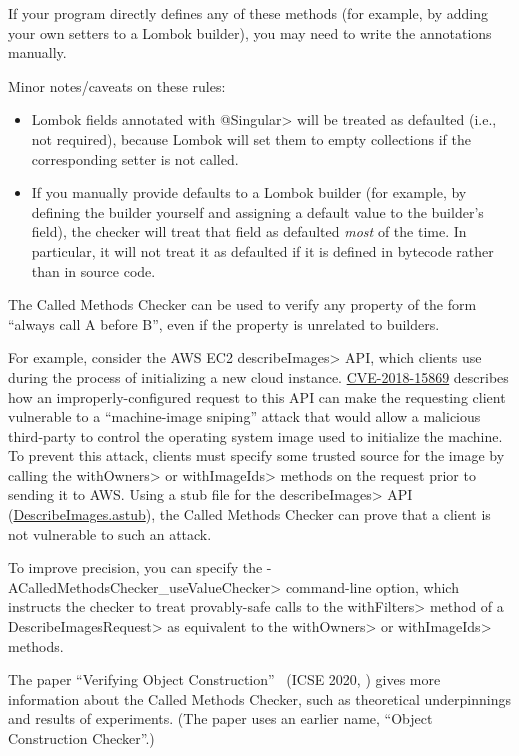 If your program directly defines any of these methods (for example, by adding your own setters to
a Lombok builder), you may need to write the annotations manually.

Minor notes/caveats on these rules:
\begin{itemize}
\item Lombok fields annotated with \<@Singular> will be treated as defaulted (i.e., not required), because
Lombok will set them to empty collections if the corresponding setter is not called.
\item If you manually provide defaults to a Lombok builder (for example, by defining the builder yourself
and assigning a default value to the builder's field), the checker will treat that field as defaulted
\emph{most} of the time. In particular, it will not treat it as defaulted if it is defined in bytecode rather
than in source code.
\end{itemize}



The Called Methods Checker can be used to verify any property of the form
``always call A before B'', even if the property is unrelated to builders.

For example, consider the AWS EC2 \<describeImages> API, which
clients use during the process of initializing a new cloud instance.
\href{https://cve.mitre.org/cgi-bin/cvename.cgi?name=CVE-2018-15869}{CVE-2018-15869}
describes how an improperly-configured request to this API can make the
requesting client vulnerable to a ``machine-image sniping'' attack that
would allow a malicious third-party to control the operating system image
used to initialize the machine. To prevent this attack, clients must
specify some trusted source for the image by calling the \<withOwners> or
\<withImageIds> methods on the request prior to sending it to AWS\@. Using
a stub file for the \<describeImages> API
(\href{https://github.com/typetools/checker-framework/blob/master/checker/src/main/java/org/checkerframework/checker/calledmethods/DescribeImages.astub}{DescribeImages.astub}),
the Called Methods Checker can prove that a client is not vulnerable to
such an attack.

To improve precision, you can specify the
\<-ACalledMethodsChecker\_useValueChecker> command-line option, which
instructs the checker to treat provably-safe calls to the \<withFilters>
method of a \<DescribeImagesRequest> as equivalent to the \<withOwners> or
\<withImageIds> methods.



The paper ``Verifying Object Construction''~\cite{KelloggRSSE2020} (ICSE 2020,
)
gives more information about the Called Methods Checker, such as
theoretical underpinnings and results of experiments.  (The paper uses an
earlier name, ``Object Construction Checker''.)
